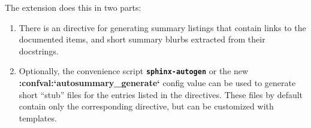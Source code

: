 \documentclass[letterpaper,10pt,english]{sphinxmanual}
\begin{document}
The {\hyperref[ext/autosummary:module\string-sphinx.ext.autosummary]{}} extension does this in two parts:
\begin{enumerate}
\item {} 
There is an {\hyperref[ext/autosummary:directive\string-autosummary]{}} directive for generating summary listings that
contain links to the documented items, and short summary blurbs extracted
from their docstrings.

\item {} 
Optionally, the convenience script \textbf{\texttt{sphinx-autogen}} or the new
{\color{red}\bfseries{}:confval:{}`autosummary\_generate{}`} config value can be used to generate short
``stub'' files for the entries listed in the {\hyperref[ext/autosummary:directive\string-autosummary]{}} directives.
These files by default contain only the corresponding {\hyperref[ext/autodoc:module\string-sphinx.ext.autodoc]{}}
directive, but can be customized with templates.

\end{enumerate}
\end{document}

